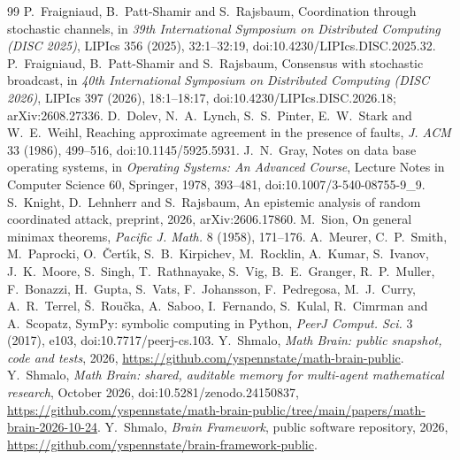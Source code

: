 \documentclass[11pt]{article}
\begin{document}
\clearpage
\begin{thebibliography}{99}
 P.~Fraigniaud, B.~Patt-Shamir and S.~Rajsbaum, Coordination through stochastic channels, in \emph{39th International Symposium on Distributed Computing (DISC 2025)}, LIPIcs 356 (2025), 32:1--32:19, doi:10.4230/LIPIcs.DISC.2025.32.
 P.~Fraigniaud, B.~Patt-Shamir and S.~Rajsbaum, Consensus with stochastic broadcast, in \emph{40th International Symposium on Distributed Computing (DISC 2026)}, LIPIcs 397 (2026), 18:1--18:17, doi:10.4230/LIPIcs.DISC.2026.18; arXiv:2608.27336.
 D.~Dolev, N.~A.~Lynch, S.~S.~Pinter, E.~W.~Stark and W.~E.~Weihl, Reaching approximate agreement in the presence of faults, \emph{J. ACM} 33 (1986), 499--516, doi:10.1145/5925.5931.
 J.~N.~Gray, Notes on data base operating systems, in \emph{Operating Systems: An Advanced Course}, Lecture Notes in Computer Science 60, Springer, 1978, 393--481, doi:10.1007/3-540-08755-9\_9.
 S.~Knight, D.~Lehnherr and S.~Rajsbaum, An epistemic analysis of random coordinated attack, preprint, 2026, arXiv:2606.17860.
 M.~Sion, On general minimax theorems, \emph{Pacific J. Math.} 8 (1958), 171--176.
 A.~Meurer, C.~P.~Smith, M.~Paprocki, O.~\v{C}ert\'{\i}k, S.~B.~Kirpichev, M.~Rocklin, A.~Kumar, S.~Ivanov, J.~K.~Moore, S.~Singh, T.~Rathnayake, S.~Vig, B.~E.~Granger, R.~P.~Muller, F.~Bonazzi, H.~Gupta, S.~Vats, F.~Johansson, F.~Pedregosa, M.~J.~Curry, A.~R.~Terrel, \v{S}.~Rou\v{c}ka, A.~Saboo, I.~Fernando, S.~Kulal, R.~Cimrman and A.~Scopatz, SymPy: symbolic computing in Python, \emph{PeerJ Comput. Sci.} 3 (2017), e103, doi:10.7717/peerj-cs.103.
 Y.~Shmalo, \emph{Math Brain: public snapshot, code and tests}, 2026, \url{https://github.com/yspennstate/math-brain-public}.
 Y.~Shmalo, \emph{Math Brain: shared, auditable memory for multi-agent mathematical research}, October 2026, doi:10.5281/zenodo.24150837, \url{https://github.com/yspennstate/math-brain-public/tree/main/papers/math-brain-2026-10-24}.
 Y.~Shmalo, \emph{Brain Framework}, public software repository, 2026, \url{https://github.com/yspennstate/brain-framework-public}.
\end{thebibliography}
\end{document}
